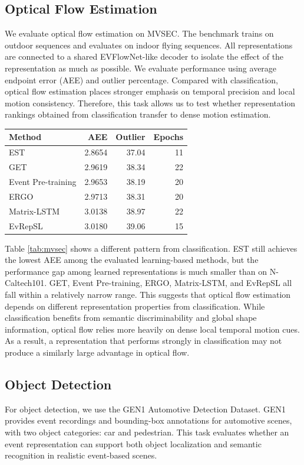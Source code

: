 \documentclass[letterpaper]{article}
\begin{document}
\subsection{Optical Flow Estimation}
We evaluate optical flow estimation on MVSEC. The benchmark trains on outdoor sequences and evaluates on indoor flying sequences. All representations are connected to a shared EVFlowNet-like decoder to isolate the effect of the representation as much as possible. We evaluate performance using average endpoint error (AEE) and outlier percentage. Compared with classification, optical flow estimation places stronger emphasis on temporal precision and local motion consistency. Therefore, this task allows us to test whether representation rankings obtained from classification transfer to dense motion estimation.

\begin{center}
\begin{tabular}{l|r|r|r}
Method & AEE & Outlier & Epochs \\
\hline
EST & 2.8654 & 37.04 & 11 \\
GET & 2.9619 & 38.34 & 22 \\
Event Pre-training & 2.9653 & 38.19 & 20 \\
ERGO & 2.9713 & 38.31 & 20 \\
Matrix-LSTM & 3.0138 & 38.97 & 22 \\
EvRepSL & 3.0180 & 39.06 & 15 \\
\end{tabular}
\label{tab:mvsec}
\end{center}

Table \ref{tab:mvsec} shows a different pattern from classification. EST still achieves the lowest AEE among the evaluated learning-based methods, but the performance gap among learned representations is much smaller than on N-Caltech101. GET, Event Pre-training, ERGO, Matrix-LSTM, and EvRepSL all fall within a relatively narrow range. This suggests that optical flow estimation depends on different representation properties from classification. While classification benefits from semantic discriminability and global shape information, optical flow relies more heavily on dense local temporal motion cues. As a result, a representation that performs strongly in classification may not produce a similarly large advantage in optical flow.

\subsection{Object Detection}
For object detection, we use the GEN1 Automotive Detection Dataset. GEN1 provides event recordings and bounding-box annotations for automotive scenes, with two object categories: car and pedestrian. This task evaluates whether an event representation can support both object localization and semantic recognition in realistic event-based scenes.
\end{document}
